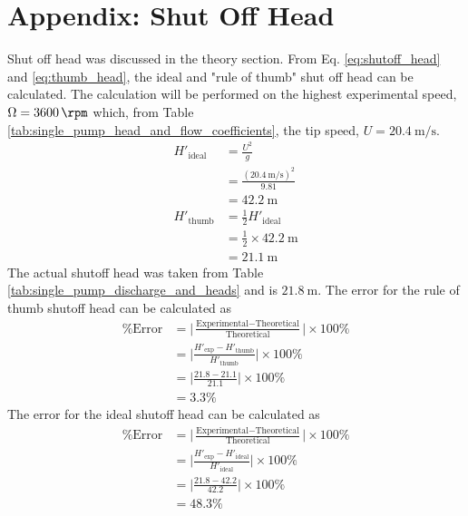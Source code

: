 \section{Appendix: Shut Off Head}
\label{sec:shut_off_head}
Shut off head was discussed in the theory section. From Eq. \ref{eq:shutoff_head} and \ref{eq:thumb_head}, the ideal and "rule of thumb" shut off head can be calculated. The calculation will be performed on the highest experimental speed, $\Omega = \qty{3600}{\rpm}$ which, from Table \ref{tab:single_pump_head_and_flow_coefficients}, the tip speed, $U = \qty{20.4}{\meter\per\second}$. 
\begin{align*}
    H'_\text{ideal} &= \frac{U^2}{g} \\
    &= \frac{(\qty{20.4}{\meter\per\second})^2}{9.81} \\
    &= \qty{42.2}{\meter} \\
    H'_\text{thumb} &= \frac{1}{2} H'_\text{ideal} \\
    &= \frac{1}{2} \times \qty{42.2}{\meter} \\
    &= \qty{21.1}{\meter}
\end{align*}
The actual shutoff head was taken from Table \ref{tab:single_pump_discharge_and_heads} and is $\qty{21.8}{\meter}$. The error for the rule of thumb shutoff head can be calculated as
\begin{align*}
    \text{\% Error} &= \bigg|\frac{\text{Experimental} - \text{Theoretical}}{\text{Theoretical}}\bigg| \times 100\% \\
    &= \bigg|\frac{H'_\text{exp} - H'_\text{thumb}}{H'_\text{thumb}}\bigg| \times 100\% \\
    &= \bigg|\frac{21.8 - 21.1}{21.1}\bigg| \times 100\% \\
    &= 3.3\%
\end{align*}
The error for the ideal shutoff head can be calculated as
\begin{align*}
    \text{\% Error} &= \bigg|\frac{\text{Experimental} - \text{Theoretical}}{\text{Theoretical}}\bigg| \times 100\% \\
    &= \bigg|\frac{H'_\text{exp} - H'_\text{ideal}}{H'_\text{ideal}}\bigg| \times 100\% \\
    &= \bigg|\frac{21.8 - 42.2}{42.2}\bigg| \times 100\% \\
    &= 48.3\%
\end{align*}